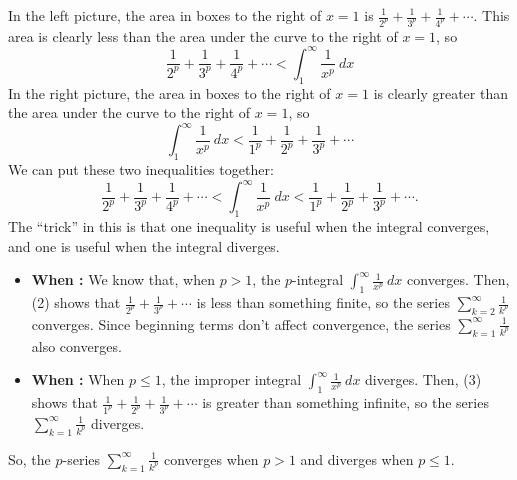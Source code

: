 \documentclass[main]{subfiles}
\begin{document}
\begin{enumerate}
\begin{solution}
    In the left picture, the area in boxes to the right of $x = 1$ is
    $\frac{1}{2^p} + \frac{1}{3^p} + \frac{1}{4^p} + \cdots$.  This area
    is clearly less than the area under the curve to the right of $x = 1$,
    so
    \begin{equation}
    \frac{1}{2^p} +
    \frac{1}{3^p} + \frac{1}{4^p} + \cdots < \int_1^\infty
    \frac{1}{x^p}~dx
    \end{equation}
    In the right picture, the area in boxes to the right of $x = 1$ is
    clearly greater than the area under the curve to the right of $x = 1$,
    so
    \begin{equation}
    \int_1^\infty
    \frac{1}{x^p}~dx < \frac{1}{1^p} + \frac{1}{2^p} + \frac{1}{3^p}
    + \cdots
    \end{equation}
    We can put these two inequalities together:
    \[ \frac{1}{2^p} + \frac{1}{3^p} + \frac{1}{4^p} + \cdots <
    \int_1^\infty \frac{1}{x^p}~dx < \frac{1}{1^p} + \frac{1}{2^p} +
    \frac{1}{3^p} + \cdots.\]
    The ``trick'' in this is that one inequality is useful when the
    integral converges, and one is useful when the integral diverges.
    \begin{itemize}
      \item \textbf{When :} We know that, when $p > 1$, the
      $p$-integral $\displaystyle \int_1^\infty \frac{1}{x^p}~dx$
      converges.  Then, (2) shows that
      $\displaystyle \frac{1}{2^p} + \frac{1}{3^p} + \cdots$ is less than
      something finite, so the series $\displaystyle \sum_{k=2}^\infty
      \frac{1}{k^p}$ converges.  Since beginning terms don't affect
      convergence, the series $\displaystyle \sum_{k=1}^\infty
      \frac{1}{k^p}$ also converges.

      \item \textbf{When :} When $p \leq 1$, the improper
      integral $\displaystyle \int_1^\infty \frac{1}{x^p}~dx$ diverges.
      Then, (3) shows that $\displaystyle
      \frac{1}{1^p} + \frac{1}{2^p} + \frac{1}{3^p} + \cdots$ is greater
      than something infinite, so the series $\displaystyle
      \sum_{k=1}^\infty \frac{1}{k^p}$ diverges.
    \end{itemize}
    So, the $p$-series $\displaystyle \sum_{k=1}^\infty \frac{1}{k^p}$
    converges when $p > 1$ and diverges when $p \leq 1$.
    \end{solution}
  


    

  \end{enumerate}
\end{document}
